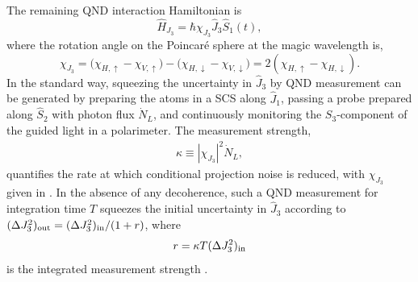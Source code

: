 \documentclass[aps,pra,twocolumn]{revtex4-1} %
\newcommand{\inp}{{\rm in}}
\newcommand{\jx}{\hat{J}_1}
\newcommand{\jz}{\hat{J}_3}
\newcommand{\chieff}{\chi_{J_3}}
\begin{document}
The remaining QND interaction Hamiltonian is
	\begin{equation} \label{Eq::FaradayHam}
		\hat{H}_{J_3} = \hbar \chieff \jz \hat{S}_1(t),
	\end{equation}
where the rotation angle on the Poincar\'{e} sphere at the magic wavelength is,
\begin{equation}\label{eq:chiJ3}
\chieff = \big( \chi_{H, \uparrow} \!-\! \chi_{V,\uparrow} \big) \!-\! \big(\chi_{H,\downarrow} \!-\! \chi_{V,\downarrow} \big) = 2(\chi_{H, \uparrow}\!-\!\chi_{H, \downarrow}).
\end{equation}
In the standard way, squeezing the uncertainty in $\jz$ by QND measurement can be generated by preparing the atoms in a SCS along $\jx$, passing a probe prepared along $\hat{S}_2$ with photon flux $\dot{N}_L$, and continuously monitoring the $S_3$-component of the guided light in a polarimeter. The measurement strength,
	\begin{align} \label{Eq::MeasurementStrength}
		\kappa \equiv |\chieff|^2 \dot{N}_L, 
	\end{align}
quantifies the rate at which conditional projection noise is reduced, with $\chieff$ given in . 
In the absence of any decoherence, such a QND measurement for integration time $T$ squeezes the initial uncertainty in $\jz$ according to $(\Delta J_3^2)_{\rm out}= (\Delta J_3^2)_{\rm in}/(1+r)$, where
	\begin{equation}
		r = \kappa T  (\Delta J_3^2)_{\inp}
	\end{equation}
is the integrated measurement strength \cite{hammerer_quantum_2010, baragiola_three-dimensional_2014}.
\end{document}
